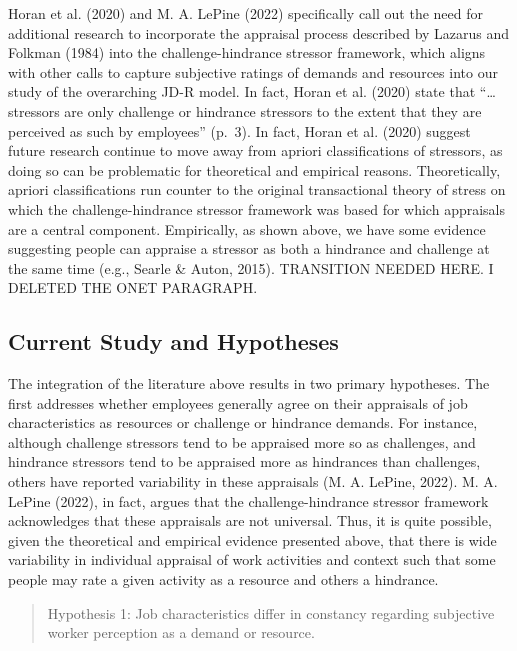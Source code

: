 \documentclass[
  english,
  man]{apa6}
\begin{document}
Horan et al. (2020) and M. A. LePine (2022) specifically call out the need for additional research to incorporate the appraisal process described by Lazarus and Folkman (1984) into the challenge-hindrance stressor framework, which aligns with other calls to capture subjective ratings of demands and resources into our study of the overarching JD-R model. In fact, Horan et al. (2020) state that ``\ldots stressors are only challenge or hindrance stressors to the extent that they are perceived as such by employees'' (p.~3). In fact, Horan et al. (2020) suggest future research continue to move away from apriori classifications of stressors, as doing so can be problematic for theoretical and empirical reasons. Theoretically, apriori classifications run counter to the original transactional theory of stress on which the challenge-hindrance stressor framework was based for which appraisals are a central component. Empirically, as shown above, we have some evidence suggesting people can appraise a stressor as both a hindrance and challenge at the same time (e.g., Searle \& Auton, 2015). TRANSITION NEEDED HERE. I DELETED THE ONET PARAGRAPH.

\hypertarget{current-study-and-hypotheses}{%
\subsection{Current Study and Hypotheses}\label{current-study-and-hypotheses}}

The integration of the literature above results in two primary hypotheses. The first addresses whether employees generally agree on their appraisals of job characteristics as resources or challenge or hindrance demands. For instance, although challenge stressors tend to be appraised more so as challenges, and hindrance stressors tend to be appraised more as hindrances than challenges, others have reported variability in these appraisals (M. A. LePine, 2022). M. A. LePine (2022), in fact, argues that the challenge-hindrance stressor framework acknowledges that these appraisals are not universal. Thus, it is quite possible, given the theoretical and empirical evidence presented above, that there is wide variability in individual appraisal of work activities and context such that some people may rate a given activity as a resource and others a hindrance.

\begin{quote}
Hypothesis 1: Job characteristics differ in constancy regarding subjective worker perception as a demand or resource.
\end{quote}
\end{document}
